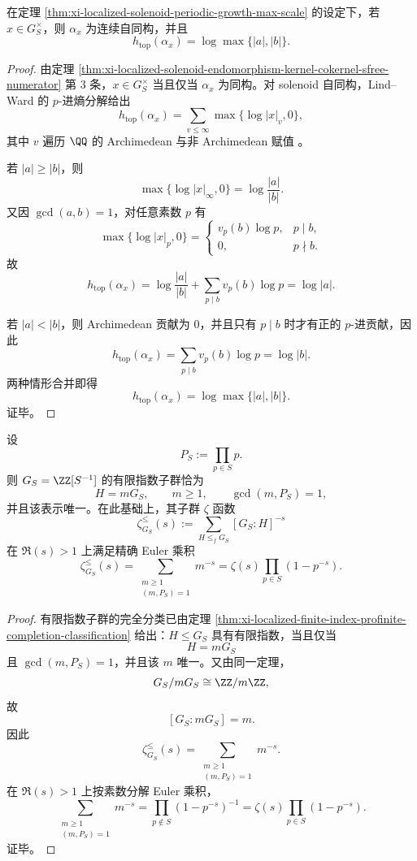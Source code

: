 \begin{corollary}\label{cor:xi-localized-solenoid-unit-entropy-max-scale}
在定理 \ref{thm:xi-localized-solenoid-periodic-growth-max-scale} 的设定下，若 \(x\in G_S^\times\)，则 \(\alpha_x\) 为连续自同构，并且
\[
\boxed{\;
h_{\mathrm{top}}(\alpha_x)=\log\max\{|a|,|b|\}.\;}
\]
\end{corollary}
\begin{proof}
由定理 \ref{thm:xi-localized-solenoid-endomorphism-kernel-cokernel-sfree-numerator} 第 \(3\) 条，\(x\in G_S^\times\) 当且仅当 \(\alpha_x\) 为同构。对 solenoid 自同构，Lind--Ward 的 \(p\)-进熵分解给出
\[
h_{\mathrm{top}}(\alpha_x)
=
\sum_{v\le \infty}\max\{\log|x|_v,0\},
\]
其中 \(v\) 遍历 \(\QQ\) 的 Archimedean 与非 Archimedean 赋值 \cite{LindWard1988SolenoidsPadicEntropy}。

若 \(|a|\ge |b|\)，则
\[
\max\{\log|x|_\infty,0\}=\log\frac{|a|}{|b|}.
\]
又因 \(\gcd(a,b)=1\)，对任意素数 \(p\) 有
\[
\max\{\log|x|_p,0\}=
\begin{cases}
v_p(b)\log p,& p\mid b,\\
0,& p\nmid b.
\end{cases}
\]
故
\[
h_{\mathrm{top}}(\alpha_x)
=
\log\frac{|a|}{|b|}
+\sum_{p\mid b}v_p(b)\log p
=
\log|a|.
\]

若 \(|a|<|b|\)，则 Archimedean 贡献为 \(0\)，并且只有 \(p\mid b\) 时才有正的 \(p\)-进贡献，因此
\[
h_{\mathrm{top}}(\alpha_x)
=
\sum_{p\mid b}v_p(b)\log p
=
\log|b|.
\]
两种情形合并即得
\[
h_{\mathrm{top}}(\alpha_x)=\log\max\{|a|,|b|\}.
\]
证毕。
\end{proof}

\begin{theorem}\label{thm:xi-localized-subgroup-zeta-euler-product}
设
\[
P_S:=\prod_{p\in S}p.
\]
则 \(G_S=\ZZ[S^{-1}]\) 的有限指数子群恰为
\[
H=mG_S,
\qquad
m\ge 1,
\qquad
\gcd(m,P_S)=1,
\]
并且该表示唯一。在此基础上，其子群 \(\zeta\) 函数
\[
\zeta_{G_S}^{\le}(s)
:=
\sum_{H\le_f G_S}[G_S:H]^{-s}
\]
在 \(\Re(s)>1\) 上满足精确 Euler 乘积
\[
\boxed{\;
\zeta_{G_S}^{\le}(s)
=
\sum_{\substack{m\ge 1\\ (m,P_S)=1}}m^{-s}
=
\zeta(s)\prod_{p\in S}(1-p^{-s}).\;}
\]
\end{theorem}
\begin{proof}
有限指数子群的完全分类已由定理 \ref{thm:xi-localized-finite-index-profinite-completion-classification} 给出：\(H\le G_S\) 具有有限指数，当且仅当
\[
H=mG_S
\]
且 \(\gcd(m,P_S)=1\)，并且该 \(m\) 唯一。又由同一定理，
\[
G_S/mG_S\cong \ZZ/m\ZZ,
\]
故
\[
[G_S:mG_S]=m.
\]
因此
\[
\zeta_{G_S}^{\le}(s)
=
\sum_{\substack{m\ge 1\\ (m,P_S)=1}}m^{-s}.
\]
在 \(\Re(s)>1\) 上按素数分解 Euler 乘积，
\[
\sum_{\substack{m\ge 1\\ (m,P_S)=1}}m^{-s}
=
\prod_{p\notin S}(1-p^{-s})^{-1}
=
\zeta(s)\prod_{p\in S}(1-p^{-s}).
\]
证毕。
\end{proof}

